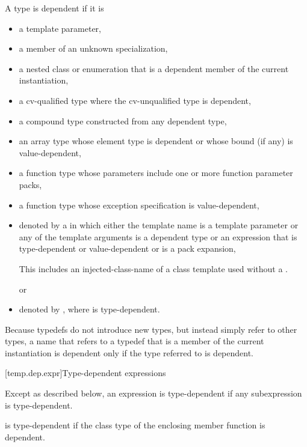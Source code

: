 \pnum
A type is dependent if it is
\begin{itemize}
\item
a template parameter,
\item
a member of an unknown specialization,
\item
a nested class or enumeration that is a dependent member of the current
instantiation,
\item
a cv-qualified type where the cv-unqualified type is dependent,
\item
a compound type constructed from any dependent type,
\item
an array type whose element type is dependent or whose
bound (if any) is value-dependent,
\item
a function type whose parameters include one or more function parameter packs,
\item
a function type whose exception specification is value-dependent,
\item
denoted by a 
in which either the template name is a template parameter or any of the
template arguments is a dependent type or an expression that is type-dependent
or value-dependent or is a pack expansion,
\begin{footnote}
This includes an injected-class-name of a class template
used without a .
\end{footnote}
or
\item denoted by \tcode{)},
where  is type-dependent.
\end{itemize}

\pnum
\begin{note}
Because typedefs do not introduce new types, but
instead simply refer to other types, a name that refers to a
typedef that is a member of the current instantiation is dependent
only if the type referred to is dependent.
\end{note}

[temp.dep.expr]{Type-dependent expressions}

\pnum
Except as described below, an expression is type-dependent if any
subexpression is type-dependent.

\pnum
{}
is type-dependent if the class type of the enclosing member function is
dependent.

